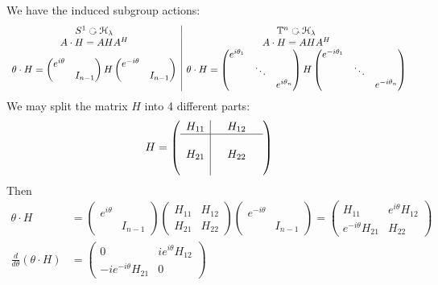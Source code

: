 \documentclass[11pt]{amsart}
\numberwithin{equation}{section}
\theoremstyle{plain}
\theoremstyle{plain}
\numberwithin{equation}{section}
\theoremstyle{remark}
\begin{document}
 We have the induced subgroup actions:
 \begin{equation*}
 \begin{array}{c|c}
S^1 \text{ \rotatebox[origin=c]{270}{$\circlearrowleft$} } \mathcal{H}_\lambda&
\mathbb{T}^n  \text{ \rotatebox[origin=c]{270}{$\circlearrowleft$} } \mathcal{H}_\lambda\\
A \cdot H=AHA^H&A \cdot H=AHA^H\\
\theta \cdot H= 
\begin{pmatrix}
e^{i\theta}&\\
&I_{n-1}
\end{pmatrix}H
\begin{pmatrix}
e^{-i\theta}&\\
&I_{n-1}
\end{pmatrix}&
\theta \cdot H= 
\begin{pmatrix}
e^{i\theta_1}&&\\
&\ddots&\\
&&e^{i\theta_n}
\end{pmatrix}H
\begin{pmatrix}
e^{-i\theta_1}&&\\
&\ddots&\\
&&e^{-i\theta_n}
\end{pmatrix}
\end{array}
 \end{equation*}
We may split the matrix $H$ into 4 different parts:
$$H=\left(\begin{array}{c|ccc}
H_{11}&&H_{12}&\\\hline
&&&\\
H_{21}&&H_{22}&\\
&&&
\end{array}\right)$$
Then
\begin{equation*}
\begin{aligned}
\theta \cdot H&= 
\begin{pmatrix}
e^{i\theta}&\\
&I_{n-1}
\end{pmatrix}
\begin{pmatrix}
H_{11}&H_{12}\\
H_{21}&H_{22}
\end{pmatrix}
\begin{pmatrix}
e^{-i\theta}&\\
&I_{n-1}
\end{pmatrix}=
\begin{pmatrix}
H_{11}&e^{i\theta}H_{12}\\
e^{-i\theta}H_{21}&H_{22}
\end{pmatrix}\\
\frac{d}{d\theta}(\theta \cdot H)&=
\begin{pmatrix}
0&ie^{i\theta}H_{12}\\
-ie^{-i\theta}H_{21}&0
\end{pmatrix}
\end{aligned}
\end{equation*}
\end{document}
